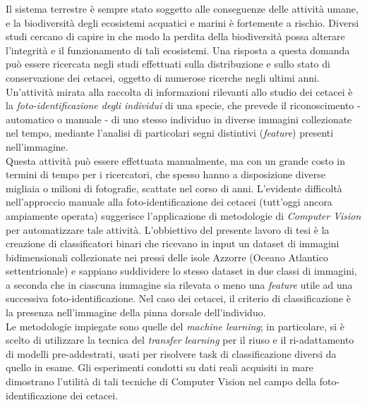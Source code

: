 \documentclass[a4paper,12pt,oneside]{book}
\newenvironment{abstract}%
{\cleardoublepage%
\thispagestyle{empty}%
\null \vfill\begin{center}%
\bfseries \abstractname \end{center}}%
{\vfill\null}
\begin{document}
\begin{frontespizio}
\Rientro{1.5cm}
\Preambolo{\renewcommand{\frontlogosep}{10pt}}
\end{frontespizio}

\begin{abstract}
Il sistema terrestre è sempre stato soggetto alle conseguenze delle attività umane, e la biodiversità degli ecosistemi acquatici e marini è fortemente a rischio. Diversi studi cercano di capire in che modo la perdita della biodiversità possa alterare l’integrità e il funzionamento di tali ecosistemi.  Una risposta a questa domanda può essere ricercata negli studi effettuati sulla distribuzione e sullo stato di conservazione dei cetacei, oggetto di numerose ricerche negli ultimi anni.\\
Un'attività mirata alla raccolta di informazioni rilevanti allo studio dei cetacei è la \textit{foto-identificazione degli individui} di una specie, che prevede il riconoscimento - automatico o manuale - di uno stesso individuo in diverse immagini collezionate nel tempo, mediante l’analisi di particolari segni distintivi (\emph{feature}) presenti nell'immagine.\\
Questa attività può essere effettuata manualmente, ma con un grande costo in termini di tempo per i ricercatori, che spesso hanno a disposizione diverse migliaia o milioni di fotografie, scattate nel corso di anni. L'evidente difficoltà nell'approccio manuale alla foto-identificazione dei cetacei (tutt'oggi ancora ampiamente operata) suggerisce l’applicazione di metodologie di \emph{Computer Vision} per automatizzare tale attività.
L’obbiettivo del presente lavoro di tesi è la creazione di classificatori binari che ricevano in input un dataset di immagini bidimensionali collezionate nei pressi delle isole Azzorre (Oceano Atlantico settentrionale) e sappiano suddividere lo stesso dataset in due classi di immagini, a seconda che in ciascuna immagine sia rilevata o meno una \emph{feature} utile ad una successiva foto-identificazione. Nel caso dei cetacei, il criterio di classificazione è la presenza nell'immagine della pinna dorsale dell'individuo.\\
Le metodologie impiegate sono quelle del \emph{machine learning}; in particolare, si è scelto di utilizzare la tecnica del \emph{transfer learning} per il riuso e il ri-adattamento di modelli pre-addestrati, usati per risolvere task di classificazione diversi da quello in esame.
Gli esperimenti condotti su dati reali acquisiti in mare dimostrano l’utilità di tali tecniche di Computer Vision nel campo della foto-identificazione dei cetacei.
\end{abstract}
\end{document}
